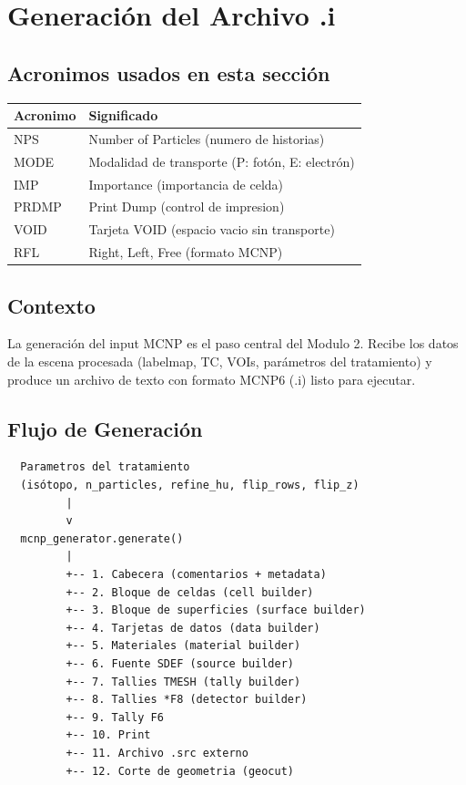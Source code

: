 \documentclass[12pt,a4paper]{article}
\begin{document}
\section{Generación del Archivo .i}
\label{sec:generacion}

\subsection*{Acronimos usados en esta sección}
\begin{tabular}{ll}
\toprule
\textbf{Acronimo} & \textbf{Significado} \\
\midrule
NPS & Number of Particles (numero de historias) \\
MODE & Modalidad de transporte (P: fotón, E: electrón) \\
IMP & Importance (importancia de celda) \\
PRDMP & Print Dump (control de impresion) \\
VOID & Tarjeta VOID (espacio vacio sin transporte) \\
RFL & Right, Left, Free (formato MCNP) \\
\bottomrule
\end{tabular}

\subsection{Contexto}

La generación del input MCNP es el paso central del Modulo 2. Recibe los datos de la escena procesada (labelmap, TC, VOIs, parámetros del tratamiento) y produce un archivo de texto con formato MCNP6 (.i) listo para ejecutar.

\subsection{Flujo de Generación}

\begin{lstlisting}
  Parametros del tratamiento
  (isótopo, n_particles, refine_hu, flip_rows, flip_z)
         |
         v
  mcnp_generator.generate()
         |
         +-- 1. Cabecera (comentarios + metadata)
         +-- 2. Bloque de celdas (cell builder)
         +-- 3. Bloque de superficies (surface builder)
         +-- 4. Tarjetas de datos (data builder)
         +-- 5. Materiales (material builder)
         +-- 6. Fuente SDEF (source builder)
         +-- 7. Tallies TMESH (tally builder)
         +-- 8. Tallies *F8 (detector builder)
         +-- 9. Tally F6
         +-- 10. Print
         +-- 11. Archivo .src externo
         +-- 12. Corte de geometria (geocut)
\end{lstlisting}
\end{document}
